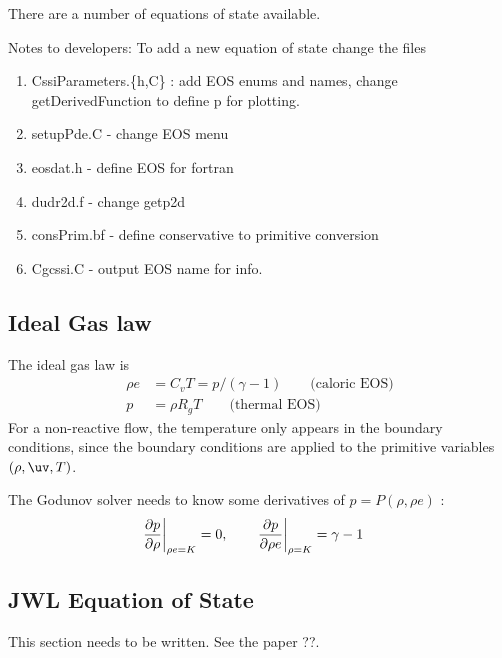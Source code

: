 \documentclass{article}
\begin{document}
There are a number of equations of state available. 

Notes to developers:
To add a new equation of state change the files
\begin{enumerate}
  \item CssiParameters.\{h,C\} : add EOS enums and names, change getDerivedFunction to define p for plotting.
  \item setupPde.C - change EOS menu 
  \item eosdat.h - define EOS for fortran
  \item dudr2d.f - change getp2d
  \item consPrim.bf - define conservative to primitive conversion
  \item Cgcssi.C - output EOS name for info. 
\end{enumerate}


\subsection{Ideal Gas law}

The ideal gas law is
\begin{align}
 \rho e & =  C_v T = p/(\gamma-1) \qquad\mbox{(caloric EOS)}\label{eq:IdealEOS1} \\
 p & = \rho R_g T               \qquad\mbox{(thermal EOS)}\label{eq:IdealEOS2}
\end{align}
For a non-reactive flow, the temperature only appears in the boundary conditions, since the 
boundary conditions are applied to the primitive variables $(\rho,\uv,T)$.

The Godunov solver needs to know some derivatives of $p=P(\rho,\rho e)$ :
\begin{align}
 \left.{\partial p \over \partial \rho}\right\vert_{\rho e =K} &= 0, \qquad
 \left.{\partial p \over \partial \rho e}\right\vert_{\rho=K} = \gamma-1 
\end{align}

\subsection{JWL Equation of State}

This section needs to be written. See the paper ??.

\end{document}
